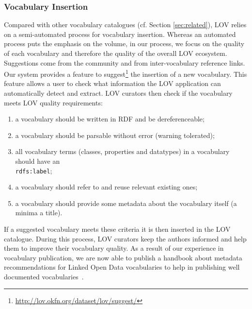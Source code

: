 \documentclass{iosart2c}
\begin{document}
	\subsubsection{Vocabulary Insertion}\label{sssec:vocabInsert} Compared with other vocabulary catalogues (cf. Section \ref{sec:related}), LOV relies on a semi-automated process for vocabulary insertion. Whereas an automated process puts the emphasis on the volume, in our process, we focus on the quality of each vocabulary and therefore the quality of the overall LOV ecosystem. Suggestions come from the community and from inter-vocabulary reference links. Our system provides a feature to suggest\footnote{\url{http://lov.okfn.org/dataset/lov/suggest/}} the insertion of a new vocabulary. This feature allows a user to check what information the LOV application can automatically detect and extract. LOV curators then check if the vocabulary meets LOV quality requirements:
\begin{enumerate}
 \item a vocabulary should be written in RDF and be dereferenceable;
 \item a vocabulary should be parsable without error (warning tolerated);
 \item all vocabulary terms (classes, properties and datatypes) in a vocabulary should have an \\ {\small\texttt{rdfs:label}};
 \item a vocabulary should refer to and reuse relevant existing ones;
 \item a vocabulary should provide some metadata about the vocabulary itself (a minima a title).
\end{enumerate}
If a suggested vocabulary meets these criteria it is then inserted in the LOV catalogue. During this process, LOV curators keep the authors informed and help them to improve their vocabulary quality. As a result of our experience in vocabulary publication, we are now able to publish a handbook about metadata recommendations for Linked Open Data vocabularies to help in publishing well documented vocabularies~\cite{vandenbussche2011metadata}.

\end{document}
